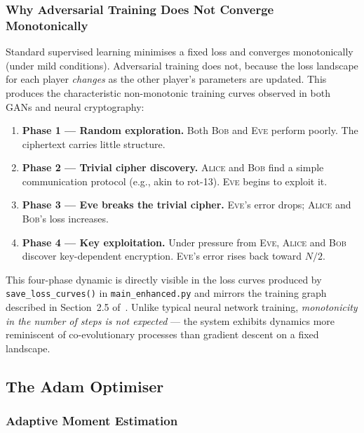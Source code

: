 \documentclass[12pt, a4paper]{article}
\newcommand{\alice}{\textsc{Alice}}
\newcommand{\bob}{\textsc{Bob}}
\newcommand{\eve}{\textsc{Eve}}
\newcommand{\code}[1]{\texttt{\color{CodeRed}#1}}
\begin{document}
\subsubsection*{Why Adversarial Training Does Not Converge Monotonically}

Standard supervised learning minimises a fixed loss and converges
monotonically (under mild conditions). Adversarial training does not,
because the loss landscape for each player \emph{changes} as the other
player's parameters are updated. This produces the characteristic
non-monotonic training curves observed in both GANs and neural
cryptography:

\begin{enumerate}[leftmargin=2em, itemsep=4pt]
  \item \textbf{Phase 1 — Random exploration.} Both \bob{} and \eve{}
        perform poorly. The ciphertext carries little structure.
  \item \textbf{Phase 2 — Trivial cipher discovery.} \alice{} and \bob{}
        find a simple communication protocol (e.g., akin to rot-13).
        \eve{} begins to exploit it.
  \item \textbf{Phase 3 — Eve breaks the trivial cipher.} \eve{}'s error
        drops; \alice{} and \bob{}'s loss increases.
  \item \textbf{Phase 4 — Key exploitation.} Under pressure from \eve{},
        \alice{} and \bob{} discover key-dependent encryption. \eve{}'s
        error rises back toward $N/2$.
\end{enumerate}

This four-phase dynamic is directly visible in the loss curves produced
by \code{save\_loss\_curves()} in \code{main\_enhanced.py} and mirrors
the training graph described in Section~2.5 of~\cite{abadi2016learning}.
Unlike typical neural network training, \emph{monotonicity in the number
of steps is not expected} — the system exhibits dynamics more reminiscent
of co-evolutionary processes than gradient descent on a fixed landscape.

\subsection{The Adam Optimiser}
\label{subsec:adam}

\subsubsection*{Adaptive Moment Estimation}
\end{document}
